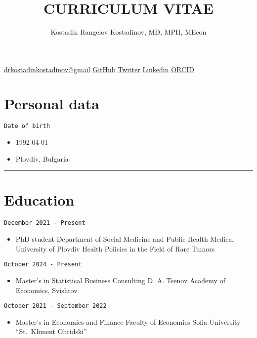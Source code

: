 \documentclass[
  12pt,
  letterpaper,
  DIV=11,
  numbers=noendperiod]{scrartcl}
\title{CURRICULUM VITAE}
\author{Kostadin Rangelov Kostadinov, MD, MPH, MEcon}
\date{}
\providecommand{\tightlist}{%
  \setlength{\itemsep}{0pt}\setlength{\parskip}{0pt}}\usepackage{longtable,booktabs,array}
\begin{document}
\maketitle


\href{https://drkostadinkostadinov@gmail.com}{drkostadinkostadinov@gmail}
\textbar{} \href{https://github.com/kostadinoff}{GitHub} \textbar{}
\href{https://twitter.com/kostadinoffMD}{Twitter} \textbar{}
\href{https://linkedin.com/in/kostadinovmd}{Linkedin} \textbar{}
\href{https://orcid.org/0000-0003-1414-8738}{ORCID}

\section{Personal data}\label{personal-data}

\texttt{Date\ of\ birth}

\begin{itemize}
\tightlist
\item
  1992-04-01
\item
  Plovdiv, Bulgaria
\end{itemize}

\begin{center}\rule{0.5\linewidth}{0.5pt}\end{center}

\section{Education}\label{education}

\texttt{December\ 2021\ -\ Present}

\begin{itemize}
\tightlist
\item
  PhD student \textbar{} Department of Social Medicine and Public Health
  \textbar{} Medical University of Plovdiv \textbar{} Health Policies in
  the Field of Rare Tumors
\end{itemize}

\texttt{October\ 2024\ -\ Present}

\begin{itemize}
\tightlist
\item
  Master's in Statistical Business Consulting \textbar{} D. A. Tsenov
  Academy of Economics, Svishtov
\end{itemize}

\texttt{October\ 2021\ -\ September\ 2022}

\begin{itemize}
\tightlist
\item
  Master's in Economics and Finance \textbar{} Faculty of Economics
  \textbar{} Sofia University ``St.~Kliment Ohridski''
\end{itemize}
\end{document}
